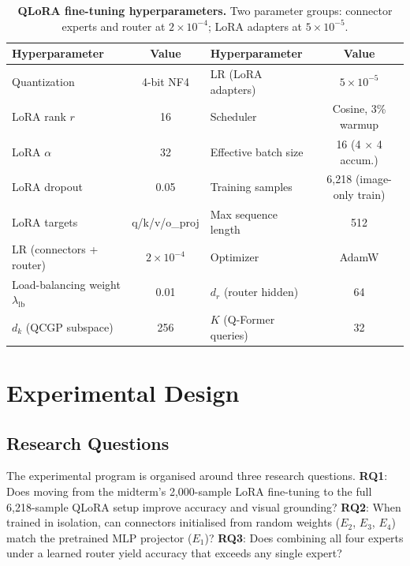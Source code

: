 \documentclass{article}
\begin{document}
\begin{table}[h]
\centering
\caption{\textbf{QLoRA fine-tuning hyperparameters.} Two parameter groups: connector experts and router at $2{\times}10^{-4}$; LoRA adapters at $5{\times}10^{-5}$.}
\label{tab:hparams}
\small
\begin{tabular}{lc@{\hspace{2em}}lc}
\toprule
\textbf{Hyperparameter} & \textbf{Value} & \textbf{Hyperparameter} & \textbf{Value} \\
\midrule
Quantization                         & 4-bit NF4 & LR (LoRA adapters)           & $5\times10^{-5}$ \\
LoRA rank $r$                        & 16        & Scheduler                    & Cosine, 3\% warmup \\
LoRA $\alpha$                        & 32        & Effective batch size         & 16 (4 $\times$ 4 accum.) \\
LoRA dropout                         & 0.05      & Training samples             & 6{,}218 (image-only train) \\
LoRA targets                         & q/k/v/o\_proj & Max sequence length      & 512 \\
LR (connectors + router)             & $2\times10^{-4}$ & Optimizer              & AdamW \\
Load-balancing weight $\lambda_{\text{lb}}$ & 0.01 & $d_r$ (router hidden)       & 64 \\
$d_k$ (QCGP subspace)                & 256       & $K$ (Q-Former queries)       & 32 \\
\bottomrule
\end{tabular}
\end{table}

\section{Experimental Design}

\subsection{Research Questions}

The experimental program is organised around three research questions. \textbf{RQ1}: Does moving from the midterm's 2{,}000-sample LoRA fine-tuning to the full 6{,}218-sample QLoRA setup improve accuracy and visual grounding? \textbf{RQ2}: When trained in isolation, can connectors initialised from random weights ($E_2$, $E_3$, $E_4$) match the pretrained MLP projector ($E_1$)? \textbf{RQ3}: Does combining all four experts under a learned router yield accuracy that exceeds any single expert?
\end{document}
